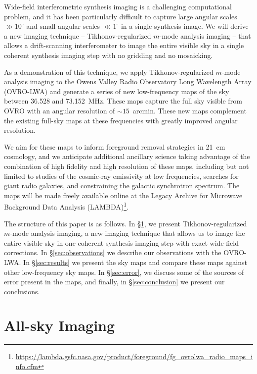 \documentclass[twocolumn]{aastex61}
\begin{document}
Wide-field interferometric synthesis imaging is a challenging computational problem, and it has been
particularly difficult to capture large angular scales $\gg 10^\circ$ and small angular scales $\ll
1^\circ$ in a single synthesis image. We will derive a new imaging technique -- Tikhonov-regularized
$m$-mode analysis imaging -- that allows a drift-scanning interferometer to image the entire visible
sky in a single coherent synthesis imaging step with no gridding and no mosaicking.

As a demonstration of this technique, we apply Tikhonov-regularized $m$-mode analysis imaging to the
Owens Valley Radio Observatory Long Wavelength Array (OVRO-LWA) and generate a series of new
low-frequency maps of the sky between 36.528 and 73.152~MHz.  These maps capture the full sky
visible from OVRO with an angular resolution of $\sim 15$~arcmin.  These new maps complement the
existing full-sky maps at these frequencies with greatly improved angular resolution.

We aim for these maps to inform foreground removal strategies in 21~cm cosmology, and we anticipate
additional ancillary science taking advantage of the combination of high fidelity and high
resolution of these maps, including but not limited to studies of the cosmic-ray emissivity at low
frequencies, searches for giant radio galaxies, and constraining the galactic synchrotron spectrum.
The maps will be made freely available online at the Legacy Archive for Microwave Background Data
Analysis (LAMBDA)\footnote{
    \url{https://lambda.gsfc.nasa.gov/product/foreground/fg_ovrolwa_radio_maps_info.cfm}
}.

The structure of this paper is as follows. In \S\ref{sec:imaging}, we present Tikhonov-regularized
$m$-mode analysis imaging, a new imaging technique that allows us to image the entire visible sky in
one coherent synthesis imaging step with exact wide-field corrections. In \S\ref{sec:observations}
we describe our observations with the OVRO-LWA. In \S\ref{sec:results} we present the sky maps and
compare these maps against other low-frequency sky maps.  In \S\ref{sec:error}, we discuss some of
the sources of error present in the maps, and finally, in \S\ref{sec:conclusion} we present our
conclusions.

\section{All-sky Imaging}\label{sec:imaging}
\end{document}
